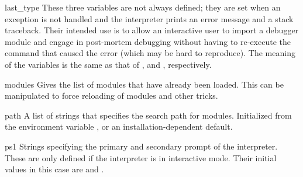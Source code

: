 \begin{datadesc}{last_type}
  These three variables are not always defined; they are set when an
  exception is not handled and the interpreter prints an error message
  and a stack traceback.  Their intended use is to allow an interactive
  user to import a debugger module and engage in post-mortem debugging
  without having to re-execute the command that caused the error (which
  may be hard to reproduce).  The meaning of the variables is the same
  as that of ,  and ,
  respectively.
\end{datadesc}

\begin{datadesc}{modules}
  Gives the list of modules that have already been loaded.
  This can be manipulated to force reloading of modules and other tricks.
\end{datadesc}

\begin{datadesc}{path}
  A list of strings that specifies the search path for modules.
  Initialized from the environment variable , or an
  installation-dependent default.
\end{datadesc}

\begin{datadesc}{ps1}
  Strings specifying the primary and secondary prompt of the
  interpreter.  These are only defined if the interpreter is in
  interactive mode.  Their initial values in this case are
   and .
\end{datadesc}

